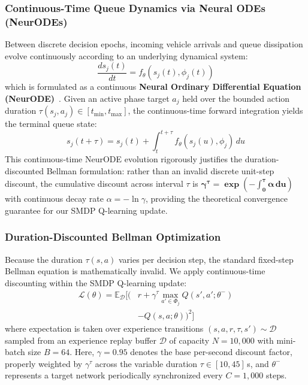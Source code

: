 \subsubsection{Continuous-Time Queue Dynamics via Neural ODEs (NeurODEs)}
Between discrete decision epochs, incoming vehicle arrivals and queue dissipation evolve continuously according to an underlying dynamical system:
\begin{equation}
\frac{ds_j(t)}{dt} = f_{\theta}\left(s_j(t), \phi_j(t)\right)
\label{eq:neurode}
\end{equation}
which is formulated as a continuous \textbf{Neural Ordinary Differential Equation (NeurODE)}~\cite{chen2018neural}. Given an active phase target $a_j$ held over the bounded action duration $\tau(s_j, a_j) \in [t_{\min}, t_{\max}]$, the continuous-time forward integration yields the terminal queue state:
\begin{equation}
s_j(t + \tau) = s_j(t) + \int_{t}^{t+\tau} f_{\theta}\left(s_j(u), \phi_j\right) \, du
\label{eq:neurode_integral}
\end{equation}
This continuous-time NeurODE evolution rigorously justifies the duration-discounted Bellman formulation: rather than an invalid discrete unit-step discount, the cumulative discount across interval $\tau$ is $\mathbf{\gamma^\tau = \exp(-\int_0^\tau \alpha \, du)}$ with continuous decay rate $\alpha = -\ln \gamma$, providing the theoretical convergence guarantee for our SMDP Q-learning update.

\subsubsection{Duration-Discounted Bellman Optimization}
Because the duration $\tau(s, a)$ varies per decision step, the standard fixed-step Bellman equation is mathematically invalid. We apply continuous-time discounting within the SMDP Q-learning update:
\begin{equation}
\begin{aligned}
\mathcal{L}(\theta) = \mathbb{E}_{\mathcal{D}} \Big[ \Big( & r + \gamma^{\tau} \max_{a' \in \Phi_j} Q(s', a'; \theta^-) \\
& - Q(s, a; \theta) \Big)^2 \Big]
\end{aligned}
\label{eq:smdp_loss}
\end{equation}
where expectation is taken over experience transitions $(s, a, r, \tau, s') \sim \mathcal{D}$ sampled from an experience replay buffer $\mathcal{D}$ of capacity $N = 10{,}000$ with mini-batch size $B = 64$. Here, $\gamma = 0.95$ denotes the base per-second discount factor, properly weighted by $\gamma^\tau$ across the variable duration $\tau \in [10, 45]$\,s, and $\theta^-$ represents a target network periodically synchronized every $C = 1{,}000$ steps.

